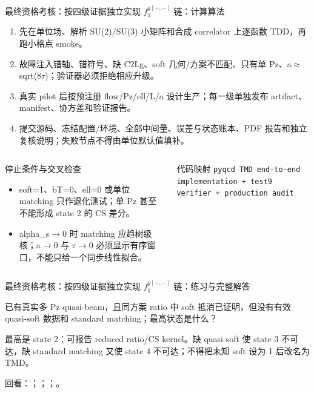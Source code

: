 \begin{frame}[t]{最终资格考核：按四级证据独立实现 \ensuremath{f_1^{g[-,-]}} 链：计算算法}
\footnotesize
{}\begin{enumerate}
\item 先在单位场、解析 SU(2)/\allowbreak{}SU(3) 小矩阵和合成 correlator 上逐函数 TDD，再跑小格点 smoke。
\item 故障注入错轴、错符号、缺 C2Lg、soft 几何/\allowbreak{}方案不匹配、只有单 Pz、a\ensuremath{\approx}sqrt(8\ensuremath{\tau})；验证器必须拒绝相应升级。
\item 真实 pilot 后按预注册 flow/\allowbreak{}Pz/\allowbreak{}ell/\allowbreak{}L/\allowbreak{}a 设计生产；每一级单独发布 artifact、manifest、协方差和验证报告。
\item 提交源码、冻结配置/\allowbreak{}环境、全部中间量、误差与状态账本、PDF 报告和独立复核说明；失败节点不得由单位默认值填补。
\end{enumerate}\begin{columns}[T,onlytextwidth]
\begin{block}{停止条件与交叉检查}\scriptsize\begin{itemize}
\item[\CheckMark] soft=1、bT=0、ell=0 或单位 matching 只作退化测试；单 Pz 甚至不能形成 state 2 的 CS 差分。
\item[\CheckMark] alpha\_s\ensuremath{\rightarrow}0 时 matching 应趋树级核；a\ensuremath{\rightarrow}0 与 \ensuremath{\tau}\ensuremath{\rightarrow}0 必须显示有序窗口，不能只给一个同步线性拟合。
\end{itemize}\end{block}
\begin{block}{代码映射}
\scriptsize \texttt{pyqcd TMD end-to-end implementation + test9 verifier + production audit}
\end{block}\end{columns}\end{frame}

\begin{frame}[t]{最终资格考核：按四级证据独立实现 \ensuremath{f_1^{g[-,-]}} 链：练习与完整解答}
\footnotesize
\begin{block}{}已有真实多 Pz quasi-beam，且同方案 ratio 中 soft 抵消已证明，但没有有效 quasi-soft 数据和 standard matching；最高状态是什么？\end{block}
\begin{exampleblock}{}最高是 state 2：可报告 reduced ratio/\allowbreak{}CS kernel。缺 quasi-soft 使 state 3 不可达，缺 standard matching 又使 state 4 不可达；不得把未知 soft 设为 1 后改名为 TMD。\end{exampleblock}
\vfill
\scriptsize 回看：；；；。
\end{frame}

